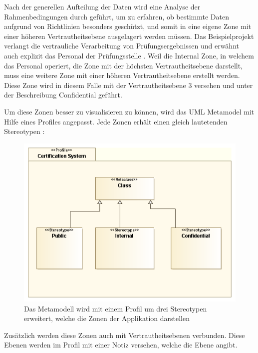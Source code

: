 Nach der generellen Aufteilung der Daten wird eine Analyse der Rahmenbedingungen durch geführt, um zu erfahren, ob bestimmte Daten aufgrund von Richtlinien besonders geschützt, und somit in eine eigene Zone mit einer höheren Vertrautheitsebene ausgelagert werden müssen. Das Beispielprojekt verlangt die vertrauliche Verarbeitung von Prüfungsergebnissen und erwähnt auch explizit das Personal der Prüfungsstelle \cite[7.3]{ISO_CERT}. Weil die Internal Zone, in welchem das Personal operiert, die Zone mit der höchsten Vertrautheitsebene darstellt, muss eine weitere Zone mit einer höheren Vertrautheitsebene erstellt werden. Diese Zone wird in diesem Falle mit der Vertrautheitsebene 3 versehen und unter der Beschreibung Confidential geführt.

Um diese Zonen besser zu visualisieren zu können, wird das UML Metamodel mit Hilfe eines Profiles angepasst. Jede Zonen erhält einen gleich lautetenden Stereotypen \cite[S. 518]{glasklar}:

\begin{figure}[H]
    \centering
    \includegraphics[scale=0.5]{uml/datastereotypes.png}
    \caption{Das Metamodell wird mit einem Profil um drei Stereotypen erweitert, welche die Zonen der Applikation darstellen}
\end{figure}

Zusätzlich werden diese Zonen auch mit Vertrautheitsebenen verbunden. Diese Ebenen werden im Profil mit einer Notiz versehen, welche die Ebene angibt.

